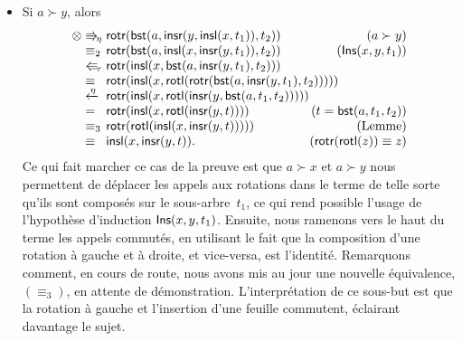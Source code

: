 \begin{itemize}
\begin{itemize}
    \item Si \(a \succ y\), alors
      \begin{equation*}
      \begin{array}{@{}r@{\;}l@{\;}l@{\hspace{-8mm}}r@{}}
        \otimes & \Rra{\eta} &
        \fun{rotr}(\fun{bst}(a,\fun{insr}(y,\fun{insl}(x,t_1)),t_2))
        & (a \succ y)\\
        & \equiv_2 & \fun{rotr}(\fun{bst}(a,\fun{insl}(x,
        \fun{insr}(y,t_1)),t_2)) & (\pred{Ins}{x,y,t_1})\\
        & \Lla{\tau} & \fun{rotr}(\fun{insl}(x,
        \fun{bst}(a,\fun{insr}(y,t_1),t_2)))\\
        & \equiv & \fun{rotr}(\fun{insl}(x,
        \fun{rotl}(\fun{rotr}(\fun{bst}(a,\fun{insr}(y,t_1),t_2)))))\\
        & \xleftarrow{\smash{\eta}} &
        \fun{rotr}(\fun{insl}(x,\fun{rotl}(\fun{insr}(y,
        \fun{bst}(a,t_1,t_2)))))\\
        & = & \fun{rotr}(\fun{insl}(x,\fun{rotl}(\fun{insr}(y,t))))
        & (t=\fun{bst}(a,t_1,t_2))\\
        & \equiv_3 & \fun{rotr}(\fun{rotl}(\fun{insl}(x,
        \fun{insr}(y,t))))) & (\text{Lemme})\\
        & \equiv & \fun{insl}(x,\fun{insr}(y,t)).
        & (\fun{rotr}(\fun{rotl}(z)) \equiv z)
      \end{array}
      \end{equation*}
      Ce qui fait marcher ce cas de la preuve est que \(a \succ x\) et
      \(a \succ y\) nous permettent de déplacer les appels aux
      rotations dans le terme de telle sorte qu'ils sont composés sur
      le sous-arbre~\(t_1\), ce qui rend possible l'usage de
      l'hypothèse d'induction \(\textsf{Ins}({x,y,t_1})\). Ensuite, nous
      ramenons vers le haut du terme les appels commutés, en utilisant
      le fait que la composition d'une rotation à gauche et à droite,
      et vice-versa, est l'identité. Remarquons comment, en cours de
      route, nous avons mis au jour une nouvelle équivalence,
      \((\equiv_3)\), en attente de démonstration. L'interprétation de
      ce sous-but est que la rotation à gauche et l'insertion d'une
      feuille commutent, éclairant davantage le sujet.


\end{itemize}
\end{itemize}
